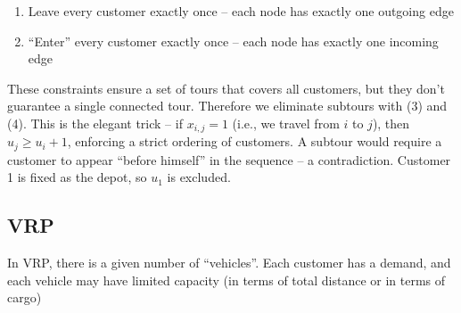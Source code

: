 \documentclass[10pt]{article}
\begin{document}
\begin{enumerate}
    \item Leave every customer exactly once -- each node has exactly one outgoing edge 
    \item ``Enter'' every customer exactly once -- each node has exactly one incoming edge 
\end{enumerate}
These constraints ensure a set of tours that covers all customers, but they don't guarantee a single connected tour. Therefore we eliminate subtours with (3) and (4). This is the elegant trick -- if $x_{i, j} = 1 $ (i.e., we travel from $i $ to $ j $), then $u_j \ge u_i + 1$, enforcing a strict ordering of customers. A subtour would require a customer to appear ``before himself'' in the sequence -- a contradiction. Customer 1 is fixed as the depot, so $u_1 $ is excluded. 
\newpage 
\subsection{VRP}
In VRP, there is a given number of ``vehicles''. Each customer has a demand, and each vehicle may have limited capacity (in terms of total distance or in terms of cargo)
\end{document}
